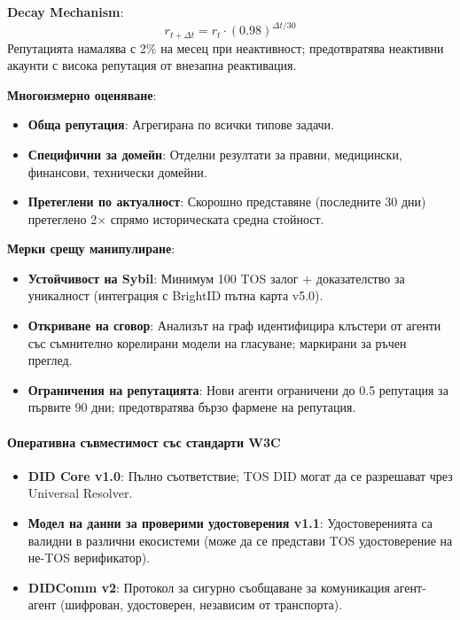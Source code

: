 \documentclass[11pt]{article}
\begin{document}
\textbf{Decay Mechanism}:
\begin{equation}
r_{t+\Delta t} = r_t \cdot (0.98)^{\Delta t / 30}
\end{equation}
Репутацията намалява с 2\% на месец при неактивност; предотвратява неактивни акаунти с висока репутация от внезапна реактивация.

\textbf{Многоизмерно оценяване}:
\begin{itemize}[noitemsep]
  \item \textbf{Обща репутация}: Агрегирана по всички типове задачи.
  \item \textbf{Специфични за домейн}: Отделни резултати за правни, медицински, финансови, технически домейни.
  \item \textbf{Претеглени по актуалност}: Скорошно представяне (последните 30 дни) претеглено 2$\times$ спрямо историческата средна стойност.
\end{itemize}

\textbf{Мерки срещу манипулиране}:
\begin{itemize}[noitemsep]
  \item \textbf{Устойчивост на Sybil}: Минимум 100 TOS залог + доказателство за уникалност (интеграция с BrightID пътна карта v5.0).
  \item \textbf{Откриване на сговор}: Анализът на граф идентифицира клъстери от агенти със съмнително корелирани модели на гласуване; маркирани за ръчен преглед.
  \item \textbf{Ограничения на репутацията}: Нови агенти ограничени до 0.5 репутация за първите 90 дни; предотвратява бързо фармене на репутация.
\end{itemize}

\paragraph{Оперативна съвместимост със стандарти W3C}
\begin{itemize}[noitemsep]
  \item \textbf{DID Core v1.0}: Пълно съответствие; TOS DID могат да се разрешават чрез Universal Resolver.
  \item \textbf{Модел на данни за проверими удостоверения v1.1}: Удостоверенията са валидни в различни екосистеми (може да се представи TOS удостоверение на не-TOS верификатор).
  \item \textbf{DIDComm v2}: Протокол за сигурно съобщаване за комуникация агент-агент (шифрован, удостоверен, независим от транспорта).
\end{itemize}
\end{document}
